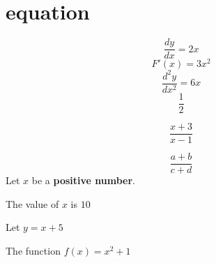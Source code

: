 \documentclass{article}
\begin{document}
\section{equation}
\[
\frac{dy}{dx}= 2x
\]
\[
F'(x)=3x^2
\]
\[
\frac{d^2 y}{dx^2}=6x
\]
\[
\frac{1}{2}
\]

\[
\frac{x+3}{x-1}
\]

\[
\frac{a+b}{c+d}
\]
Let $x$ be a \textbf{positive number}.

The value of $x$ is $10$

Let $y=x+5$

The function $f(x)=x^2 +1$
\end{document}
